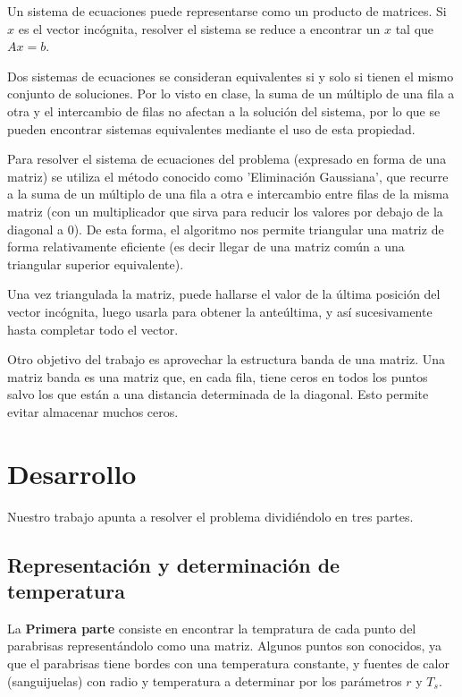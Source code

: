 \documentclass[a4paper]{article}
\begin{document}
Un sistema de ecuaciones puede representarse como un producto de matrices. Si $x$ es el vector incógnita, resolver el sistema se reduce a encontrar un $x$ tal que $Ax=b$.

Dos sistemas de ecuaciones se consideran equivalentes si y solo si tienen el mismo conjunto de soluciones. Por lo visto en clase, la suma de un múltiplo de una fila a otra y el intercambio de filas no afectan a la solución del sistema, por lo que se pueden encontrar sistemas equivalentes mediante el uso de esta propiedad.

Para resolver el sistema de ecuaciones del problema (expresado en forma de una matriz) se utiliza el método conocido como 'Eliminación Gaussiana', que recurre a la suma de un múltiplo de una fila a otra e intercambio entre filas de la misma matriz (con un multiplicador que sirva para reducir los valores por debajo de la diagonal a 0). De esta forma, el algoritmo nos permite triangular una matriz de forma relativamente eficiente (es decir llegar de una matriz común a una triangular superior equivalente).

Una vez triangulada la matriz, puede hallarse el valor de la última posición del vector incógnita, luego usarla para obtener la anteúltima, y así sucesivamente hasta completar todo el vector.

Otro objetivo del trabajo es aprovechar la estructura banda de una matriz. Una matriz banda es una matriz que, en cada fila, tiene ceros en todos los puntos salvo los que están a una distancia determinada de la diagonal. Esto permite evitar almacenar muchos ceros.

\newpage

\section{Desarrollo}
\label{sec:desarrollo}


Nuestro trabajo apunta a resolver el problema dividiéndolo en tres partes.

\subsection{Representación y determinación de temperatura}

La \textbf{Primera parte} consiste en encontrar la tempratura de cada punto del parabrisas  representándolo como una matriz. Algunos puntos son conocidos, ya que el parabrisas tiene bordes con una temperatura constante, y fuentes de calor (sanguijuelas) con radio y temperatura a determinar por los parámetros $r$ y $T_s$.
\end{document}
